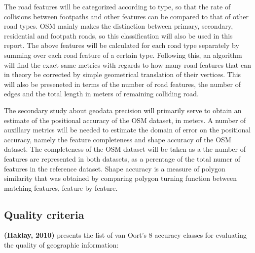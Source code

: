 \documentclass{kththesis}
\begin{document}
The road features will be categorized according to type, so that the rate of collisions between footpaths and other features can be compared to that of other road types.
OSM mainly makes the distinction between primary, secondary, residential and footpath roads, so this classification will also be used in this report.
The above features will be calculated for each road type separately by summing over each road feature of a certain type.
Following this, an algorithm will find the exact same metrics with regards to how many road features that can in theory be corrected by simple geometrical translation of their vertices.
This will also be preseneted in terms of the number of road features, the number of edges and the total length in meters of remaining colliding road.

The secondary study about geodata precision will primarily serve to obtain an estimate of the positional accuracy of the OSM dataset, in meters.
A number of auxillary metrics will be needed to estimate the domain of error on the positional accuracy, namely the feature completeness and shape accuracy of the OSM dataset.
The completeness of the OSM dataset will be taken as a the number of features are represented in both datasets, as a perentage of the total numer of features in the reference dataset.
Shape accuracy is a measure of polygon similarity that was obtained by comparing polygon turning function between matching features, feature by feature.

\subsection{Quality criteria}

\textbf{(Haklay, 2010)} presents the list of van Oort's 8 accuracy classes for evaluating the quality of geographic information:
\end{document}
